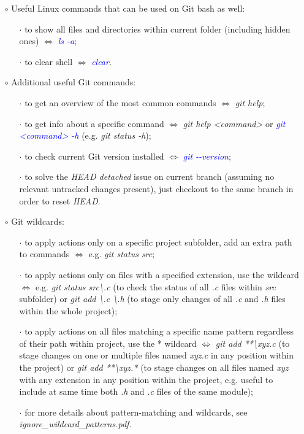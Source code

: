 \documentclass[a4paper,portrait,10pt]{article}   %
\newcommand{\mybulletlvA}{$\circ$}   %
\newcommand{\mybulletlvB}{$\cdot$}   %
\newcommand{\mydiv}{$\Leftrightarrow$ }   %
\newcommand{\mysapo}[1]{\textquotesingle #1\textquotesingle }   %
\newcommand{\mycmd}[1]{\textcolor{blue}{\textit{#1}}}   %
\newcommand{\myparvspace}{\vspace{4mm}}   %
\begin{document}
\begin{itemize}
\item[\mybulletlvA] Useful Linux commands that can be used on Git bash as well:
\begin{itemize}
  \item[\mybulletlvB] to show all files and directories within current folder (including hidden ones) \mydiv \mycmd{ls -a};
  \item[\mybulletlvB] to clear shell \mydiv \mycmd{clear}.
\end{itemize}
\myparvspace

\item[\mybulletlvA] Additional useful Git commands:
\begin{itemize}
  \item[\mybulletlvB] to get an overview of the most common commands \mydiv \textit{git help};
  \item[\mybulletlvB] to get info about a specific command \mydiv \textit{git help <command>} or \mycmd{git <command> -h} (e.g. \textit{git status -h});
  \item[\mybulletlvB] to check current Git version installed \mydiv \mycmd{git -{}-version};
  \item[\mybulletlvB] to solve the \textit{HEAD detached} issue on current branch (assuming no relevant untracked changes present), just checkout to the same branch in order to reset \textit{HEAD}.
\end{itemize}
\myparvspace

\item[\mybulletlvA] Git wildcards:
\begin{itemize}
  \item[\mybulletlvB] to apply actions only on a specific project subfolder, add an extra path to commands \mydiv e.g. \textit{git status src};
  \item[\mybulletlvB] to apply actions only on files with a specified extension, use the \mysapo{*} wildcard \mydiv e.g. \textit{git status src\textbackslash *.c} (to check the status of all \textit{.c} files within \textit{src} subfolder) or \textit{git add \textbackslash *.c \textbackslash *.h} (to stage only changes of all \textit{.c} and \textit{.h} files within the whole project);
  \item[\mybulletlvB] to apply actions on all files matching a specific name pattern regardless of their path within project, use the \mysapo{**} wildcard \mydiv \textit{git add **\textbackslash xyz.c} (to stage changes on one or multiple files named \textit{xyz.c} in any position within the project) or \textit{git add **\textbackslash xyz.*} (to stage changes on all files named \textit{xyz} with any extension in any position within the project, e.g. useful to include at same time both \textit{.h} and \textit{.c} files of the same module);
  \item[\mybulletlvB] for more details about pattern-matching and wildcards, see \textit{ignore\_wildcard\_patterns.pdf}.
\end{itemize}
\myparvspace


\end{itemize}
\end{document}

